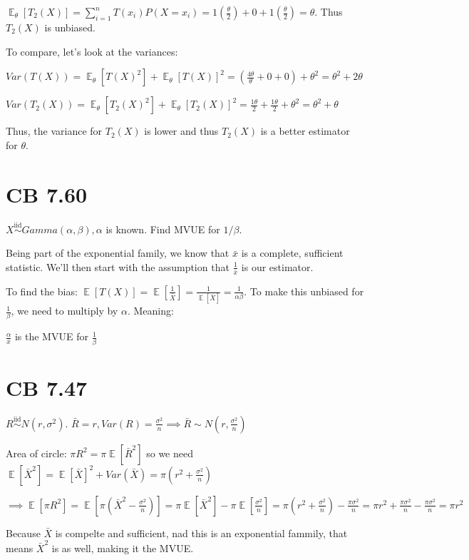 \documentclass{article}
\DeclareMathOperator{\EX}{\mathbb{E}} %
\newcommand{\ext}{\EX_{\theta}}
\let\Oldsum=\sum
\renewcommand{\sum}{\Oldsum\limits}
\newcommand{\iiddist}{\overset{\mathrm{iid}}{\sim}}
\begin{document}
$\ext[T_2(X)] = \sum_{i = 1}^n T(x_i)P(X = x_i) = 1(\frac{\theta}{2}) + 0 + 1(\frac{\theta}{2}) = \theta$. Thus $T_2(X)$ is unbiased.

To compare, let's look at the variances: 

$Var(T(X)) = \ext[T(X)^2] + \ext[T(X)]^2 = (\frac{4\theta}{\theta} + 0 + 0) + \theta^2 = \theta^2 + 2\theta$

$Var(T_2(X)) = \ext[T_2(X)^2] + \ext[T_2(X)]^2 = \frac{1\theta}{2} + \frac{1\theta}{2} + \theta^2 = \theta^2 + \theta$

Thus, the variance for $T_2(X)$ is lower and thus $T_2(X)$ is a better estimator for $\theta$. 

\section{CB 7.60}

$X \iiddist Gamma(\alpha, \beta), \alpha$ is known. Find MVUE for $1/\beta$. 

Being part of the exponential family, we know that $\bar{x}$ is a complete, sufficient statistic. We'll then start with the assumption that $\frac{1}{\bar{x}}$ is our estimator. 

To find the bias: $\EX[T(X)] = \EX[\frac{1}{\bar{X}}] = \frac{1}{\EX[\bar{X}]} = \frac{1}{\alpha\beta}$. To make this unbiased for $\frac{1}{\beta}$, we need to multiply by $\alpha$. Meaning:

$\frac{\alpha}{\bar{x}}$ is the MVUE for $\frac{1}{\beta}$

\section{CB 7.47}

$R \iiddist N(r, \sigma^2)$. $\bar{R} = r, Var(R) = \frac{\sigma^2}{n} \implies \bar{R} \sim N(r, \frac{\sigma^2}{n})$

Area of circle: $\pi R^2 = \pi \EX[\bar{R}^2]$ so we need $\EX[\bar{X}^2] = \EX[\bar{X}]^2 + Var(\bar{X}) = \pi(r^2 + \frac{\sigma^2}{n})$

$\implies \EX[\pi R^2] = \EX[\pi(\bar{X}^2 - \frac{\sigma^2}{n})] = \pi\EX[\bar{X}^2] - \pi\EX[\frac{\sigma^2}{n}] = \pi(r^2 + \frac{\sigma^2}{n}) - \frac{\pi\sigma^2}{n} = \pi r^2 + \frac{\pi\sigma^2}{n} - \frac{\pi\sigma^2}{n} = \pi r^2$

Because $\bar{X}$ is compelte and sufficient, nad this is an exponential fammily, that means $\bar{X}^2$ is as well, making it the MVUE. 
\end{document}
